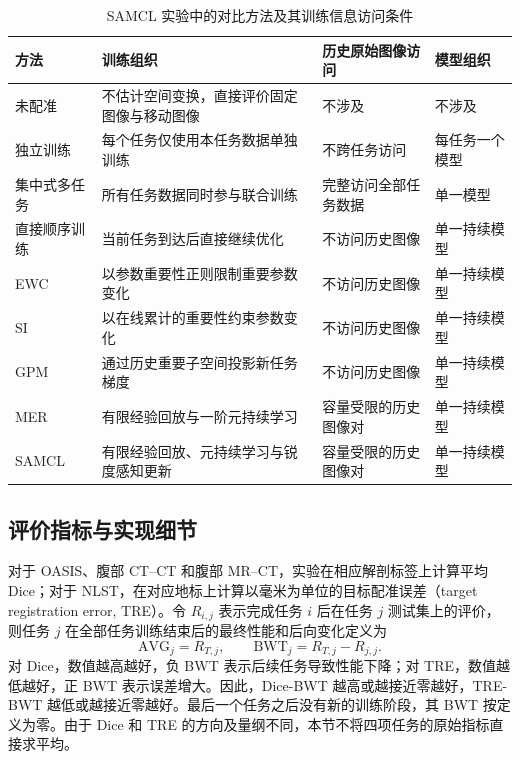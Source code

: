 \begin{table}[htbp]
\centering
\caption{SAMCL 实验中的对比方法及其训练信息访问条件}
\label{tab:samcl-baselines}
\thesistablefont
\renewcommand{\arraystretch}{1.16}
\setlength{\tabcolsep}{3pt}
\begin{tabular}{p{1.8cm}p{4.6cm}p{3.2cm}p{2.8cm}}
\toprule
方法 & 训练组织 & 历史原始图像访问 & 模型组织 \\
\midrule
未配准 & 不估计空间变换，直接评价固定图像与移动图像 & 不涉及 & 不涉及 \\
独立训练 & 每个任务仅使用本任务数据单独训练 & 不跨任务访问 & 每任务一个模型 \\
集中式多任务 & 所有任务数据同时参与联合训练 & 完整访问全部任务数据 & 单一模型 \\
直接顺序训练 & 当前任务到达后直接继续优化 & 不访问历史图像 & 单一持续模型 \\
EWC & 以参数重要性正则限制重要参数变化 & 不访问历史图像 & 单一持续模型 \\
SI & 以在线累计的重要性约束参数变化 & 不访问历史图像 & 单一持续模型 \\
GPM & 通过历史重要子空间投影新任务梯度 & 不访问历史图像 & 单一持续模型 \\
MER & 有限经验回放与一阶元持续学习 & 容量受限的历史图像对 & 单一持续模型 \\
SAMCL & 有限经验回放、元持续学习与锐度感知更新 & 容量受限的历史图像对 & 单一持续模型 \\
\bottomrule
\end{tabular}
\end{table}

\subsection{评价指标与实现细节}
\label{subsubsec:samcl-implementation}

对于 OASIS、腹部 CT--CT 和腹部 MR--CT，实验在相应解剖标签上计算平均 Dice；对于 NLST，在对应地标上计算以毫米为单位的目标配准误差（target registration error, TRE）。令 $R_{i,j}$ 表示完成任务 $i$ 后在任务 $j$ 测试集上的评价，则任务 $j$ 在全部任务训练结束后的最终性能和后向变化定义为
\begin{equation}
\mathrm{AVG}_j=R_{T,j},
\qquad
\mathrm{BWT}_j=R_{T,j}-R_{j,j}.
\label{eq:samcl-avg-bwt}
\end{equation}
对 Dice，数值越高越好，负 BWT 表示后续任务导致性能下降；对 TRE，数值越低越好，正 BWT 表示误差增大。因此，Dice-BWT 越高或越接近零越好，TRE-BWT 越低或越接近零越好。最后一个任务之后没有新的训练阶段，其 BWT 按定义为零。由于 Dice 和 TRE 的方向及量纲不同，本节不将四项任务的原始指标直接求平均。


